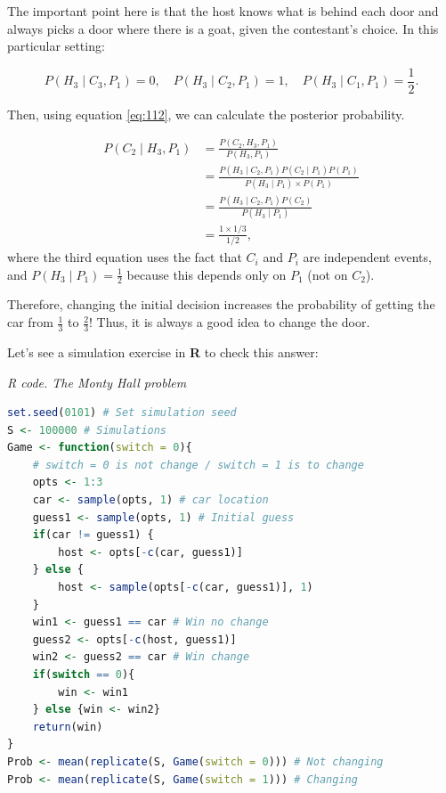 The important point here is that the host knows what is behind each door and always picks a door where there is a goat, given the contestant's choice. In this particular setting:

\[
P(H_3 \mid C_3, P_1) = 0, \quad P(H_3 \mid C_2, P_1) = 1, \quad P(H_3 \mid C_1, P_1) = \frac{1}{2}.
\]

Then, using equation \ref{eq:112}, we can calculate the posterior probability.

\begin{align*}
	P(C_2\mid H_3,P_1)&= \frac{P(C_2,H_3,P_1)}{P(H_3,P_1)}\\
	&= \frac{P(H_3\mid C_2,P_1)P(C_2\mid P_1)P(P_1)}{P(H_3\mid P_1)\times P(P_1)}\\
	&= \frac{P(H_3\mid C_2,P_1)P(C_2)}{P(H_3\mid P_1)}\\
	&=\frac{1\times 1/3}{1/2},
\end{align*}
where the third equation uses the fact that \( C_i \) and \( P_i \) are independent events, and \( P(H_3 \mid P_1) = \frac{1}{2} \) because this depends only on \( P_1 \) (not on \( C_2 \)).

Therefore, changing the initial decision increases the probability of getting the car from \( \frac{1}{3} \) to \( \frac{2}{3} \)! Thus, it is always a good idea to change the door.

Let's see a simulation exercise in \textbf{R} to check this answer:

\begin{tcolorbox}[enhanced,width=4.67in,center upper,
	fontupper=\large\bfseries,drop shadow southwest,sharp corners]
	\textit{R code. The Monty Hall problem}
	\begin{VF}
		\begin{lstlisting}[language=R]
set.seed(0101) # Set simulation seed
S <- 100000 # Simulations
Game <- function(switch = 0){
	# switch = 0 is not change / switch = 1 is to change
	opts <- 1:3 
	car <- sample(opts, 1) # car location
	guess1 <- sample(opts, 1) # Initial guess 
	if(car != guess1) {
		host <- opts[-c(car, guess1)]
	} else {
		host <- sample(opts[-c(car, guess1)], 1)
	}	
	win1 <- guess1 == car # Win no change
	guess2 <- opts[-c(host, guess1)]	
	win2 <- guess2 == car # Win change
	if(switch == 0){
		win <- win1
	} else {win <- win2}
	return(win)
}
Prob <- mean(replicate(S, Game(switch = 0))) # Not changing
Prob <- mean(replicate(S, Game(switch = 1))) # Changing 
\end{lstlisting}
	\end{VF}
\end{tcolorbox}

